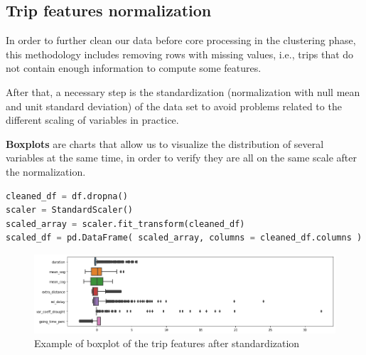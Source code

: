 \subsection{Trip features normalization}

In order to further clean our data before core processing in the clustering phase, this methodology includes removing rows with missing values, i.e., trips that do not contain enough information to compute some features.

After that, a necessary step is the standardization (normalization with null mean and unit standard deviation) of the data set to avoid problems related to the different scaling of variables in practice.

\textbf{Boxplots} are charts that allow us to visualize the distribution of several variables at the same time, in order to verify they are all on the same scale after the normalization.

\begin{lstlisting}[language=Python]
cleaned_df = df.dropna()
scaler = StandardScaler()
scaled_array = scaler.fit_transform(cleaned_df)
scaled_df = pd.DataFrame( scaled_array, columns = cleaned_df.columns )
\end{lstlisting}

\begin{figure}[H]
    \centering
    \includegraphics[width=16cm]{Images/2/boxplot.png}
    \caption{Example of boxplot of the trip features after standardization}
\end{figure}


